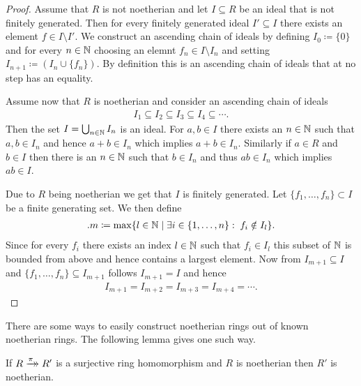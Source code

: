 \documentclass[../notes.tex]{subfiles}
\begin{document}
\begin{proof}
  Assume that $R$ is not noetherian and let $I \subseteq R$ be an ideal that is not finitely
  generated. Then for every finitely generated ideal $I' \subseteq I$ there exists an
  element $f \in I \setminus I'$. We construct an ascending chain of ideals by defining
  $I_0 \coloneqq \{0\}$ and for every $n \in {\mathbb{N}}$ choosing an elemnt $f_n \in I \setminus I_n$
  and setting $I_{n+1} \coloneqq (I_n \cup \{f_n\})$. By definition this is an ascending
  chain of ideals that at no step has an equality.

  \smallskip
  \noindent
  Assume now that $R$ is noetherian and consider an ascending chain of ideals
  \begin{align*}
    I_1 \subseteq I_2 \subseteq I_3 \subseteq I_4 \subseteq \cdots.
  \end{align*}
  Then the set $I = \bigcup_{n \in {\mathbb{N}}} I_n$ is an ideal. For $a,b \in I$ there exists an
  $n \in {\mathbb{N}}$ such that $a,b \in I_n$ and hence $a + b \in I_n$ which implies $a + b \in I_n$.
  Similarly if $a \in R$ and $b \in I$ then there is an $n \in {\mathbb{N}}$ such that $b \in I_n$
  and thus $ab \in I_n$ which implies $ab \in I$.

  \noindent
  Due to $R$ being noetherian we get that $I$ is finitely generated. Let
  $\{f_1, \dots, f_n\} \subset I$ be a finite generating set. We then define
  \begin{align*}.
    m \coloneqq \operatorname{max} \{l \in {\mathbb{N}} \mid \exists i \in \{1, \dots, n\}: \; f_i \notin I_l\}.
  \end{align*}
  Since for every $f_i$ there exists an index $l \in {\mathbb{N}}$ such that $f_i \in I_l$ this subset
  of ${\mathbb{N}}$ is bounded from above and hence contains a largest element.
  Now from $I_{m+1} \subseteq I$ and $\{f_1, \dots, f_n\} \subseteq I_{m+1}$ follows
  $I_{m+1} = I$ and hence
  \begin{align*}
    I_{m+1} = I_{m+2} = I_{m+3} = I_{m+4} = \cdots.
  \end{align*}
  
\end{proof}

\smallskip
\noindent
There are some ways to easily construct noetherian rings out of known noetherian rings.
The following lemma gives one such way.

\smallskip
\begin{lemm}{}{}
  If $R \xrightarrow[]{\pi}\mathrel{\mkern-14mu}\rightarrow R'$ is a surjective ring homomorphism and $R$ is
  noetherian then $R'$ is noetherian.
\end{lemm}
\end{document}
